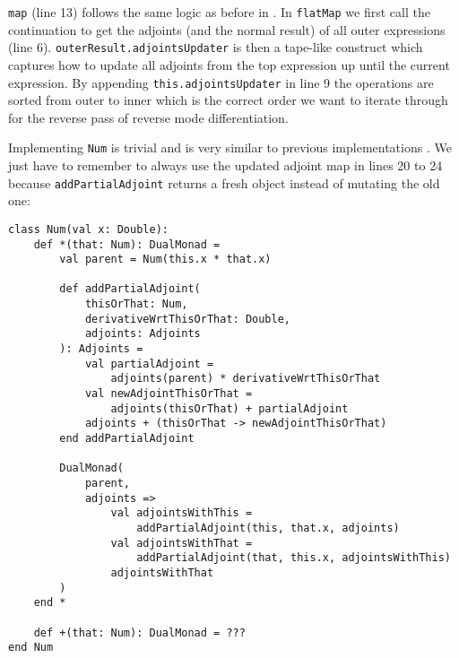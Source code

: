 \lstinline{map} (line 13) follows the same logic as before in . In \lstinline{flatMap} we first call the continuation to get the adjoints (and the normal result) of all outer expressions (line 6). \lstinline{outerResult.adjointsUpdater} is then a tape-like construct which captures how to update all adjoints from the top expression up until the current expression. By appending \lstinline{this.adjointsUpdater} in line 9 the operations are sorted from outer to inner which is the correct order we want to iterate through for the reverse pass of reverse mode differentiation.

Implementing \lstinline{Num} is trivial and is very similar to previous implementations . We just have to remember to always use the updated adjoint map in lines 20 to 24 because \lstinline{addPartialAdjoint} returns a fresh object instead of mutating the old one:
\begin{lstlisting}
class Num(val x: Double):
    def *(that: Num): DualMonad =
        val parent = Num(this.x * that.x)

        def addPartialAdjoint(
            thisOrThat: Num, 
            derivativeWrtThisOrThat: Double, 
            adjoints: Adjoints
        ): Adjoints =
            val partialAdjoint = 
                adjoints(parent) * derivativeWrtThisOrThat
            val newAdjointThisOrThat = 
                adjoints(thisOrThat) + partialAdjoint
            adjoints + (thisOrThat -> newAdjointThisOrThat)
        end addPartialAdjoint

        DualMonad(
            parent,
            adjoints =>
                val adjointsWithThis = 
                    addPartialAdjoint(this, that.x, adjoints)
                val adjointsWithThat = 
                    addPartialAdjoint(that, this.x, adjointsWithThis)
                adjointsWithThat
        )
    end *

    def +(that: Num): DualMonad = ???
end Num
\end{lstlisting}

